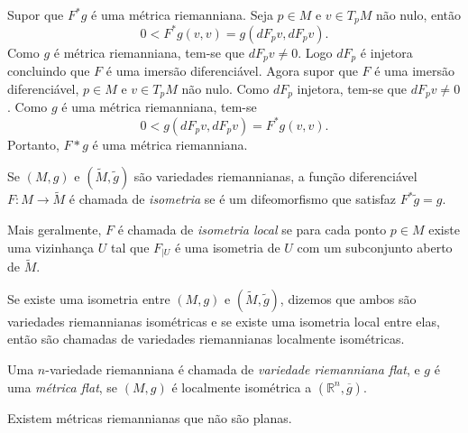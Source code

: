 \begin{demonstracao}
	Supor que $F^*g$ é uma métrica riemanniana. Seja $p \in M$ e $v \in T_pM$ não nulo, então
	\begin{equation*}
		0 < F^*g(v,v) = g(dF_p v, dF_p v).
	\end{equation*}
	Como $g$ é métrica riemanniana, tem-se que $dF_p v \neq 0$. Logo $dF_p$ é injetora concluindo que $F$ é uma imersão diferenciável.
	Agora supor que $F$ é uma imersão diferenciável, $p \in M$ e $v \in T_pM$ não nulo. Como $dF_p$ injetora, tem-se que $dF_p v \neq 0$. Como $g$ é uma métrica riemanniana, tem-se
	\begin{equation*}
		0 < g(dF_p v, dF_p v) = F^*g(v,v).
	\end{equation*}
	Portanto, $F* g$ é uma métrica riemanniana.
\end{demonstracao}

\begin{definicao}
	Se $(M,g)$ e $(\tilde{M}, \tilde{g})$ são variedades riemannianas, a função diferenciável $F: M \rightarrow \tilde{M}$ é chamada de \emph{isometria} se é um difeomorfismo que satisfaz $F^* \tilde{g} = g$.
\end{definicao}

\begin{observacao}
	Mais geralmente, $F$ é chamada de \emph{isometria local} se para cada ponto $p \in M$ existe uma vizinhança $U$ tal que $F_{|U}$ é uma isometria de $U$ com um subconjunto aberto de $\tilde{M}$.
\end{observacao}

\begin{observacao}
	Se existe uma isometria entre $(M,g)$ e $(\tilde{M}, \tilde{g})$, dizemos que ambos são variedades riemannianas isométricas e se existe uma isometria local entre elas, então são chamadas de variedades riemannianas localmente isométricas.
\end{observacao}

\begin{definicao}
	Uma $n$-variedade riemanniana é chamada de \emph{variedade riemanniana flat}, e $g$ é uma \emph{métrica flat}, se $(M,g)$ é localmente isométrica a $(\mathbb{R}^n,\overline{g})$.
\end{definicao}

\begin{observacao}
	Existem métricas riemannianas que não são planas.
\end{observacao}



